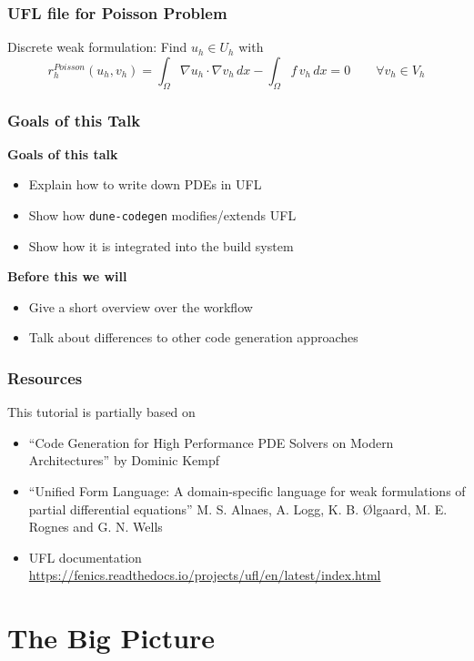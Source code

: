 \documentclass[ignorenonframetext,11pt]{beamer}
\theoremstyle{definition}
\begin{document}
\begin{frame}
  \frametitle{UFL file for Poisson Problem}

  Discrete weak formulation: Find $u_h \in U_h$ with
  \begin{equation*}
    r_h^{Poisson}(u_h, v_h) = \int_\Omega \nabla u_h \cdot \nabla v_h \, dx
    - \int_\Omega f \, v_h \, dx = 0 \qquad \forall v_h \in V_h
  \end{equation*}
  
\end{frame}

\begin{frame}
  \frametitle{Goals of this Talk}

  \textbf{Goals of this talk}
  \begin{itemize}
  \item Explain how to write down PDEs in UFL
  \item Show how \lstinline{dune-codegen} modifies/extends UFL
  \item Show how it is integrated into the build system
  \end{itemize}
  \vfill
  \textbf{Before this we will}
  \begin{itemize}
  \item Give a short overview over the workflow
  \item Talk about differences to other code generation approaches
  \end{itemize}
\end{frame}

\begin{frame}
  \frametitle{Resources}
  This tutorial is partially based on
  \begin{itemize}
  \item ``Code Generation for High Performance PDE Solvers
    on Modern Architectures'' by Dominic Kempf
  \item ``Unified Form Language: A domain-specific language for weak
    formulations of partial differential equations'' M. S. Alnaes, A. Logg,
    K. B. Ølgaard, M. E. Rognes and G. N. Wells
  \item UFL documentation
    \url{https://fenics.readthedocs.io/projects/ufl/en/latest/index.html}
  \end{itemize}

\end{frame}
\section{The Big Picture}
\end{document}
